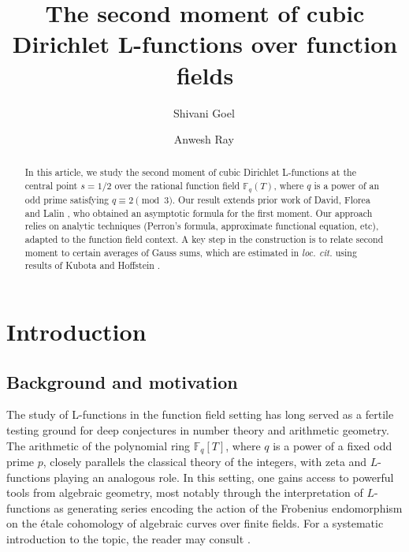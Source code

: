 \documentclass[table]{amsart}
\numberwithin{equation}{section}
\begin{document}
\title[Second moments for cubic L-functions]{The second moment of cubic Dirichlet L-functions over function fields}


\author[S.~Goel]{Shivani Goel\, }
\address[Goel]{Chennai Mathematical Institute, H1, SIPCOT IT Park, Kelambakkam, Siruseri, Tamil Nadu 603103, India}

\author[A.~Ray]{Anwesh Ray\, }
\address[Ray]{Chennai Mathematical Institute, H1, SIPCOT IT Park, Kelambakkam, Siruseri, Tamil Nadu 603103, India}










\begin{abstract}
In this article, we study the second moment of cubic Dirichlet L-functions at the central point $s=1/2$ over the rational function field $\mathbb{F}_q(T)$, where $q$ is a power of an odd prime satisfying $q \equiv 2 \pmod{3}$. Our result extends prior work of David, Florea and Lalin \cite{DFLCubic}, who obtained an asymptotic formula for the first moment. Our approach relies on analytic techniques (Perron's formula, approximate functional equation, etc), adapted to the function field context.  A key step in the construction is to relate second moment to certain averages of Gauss sums, which are estimated in \emph{loc. cit.} using results of Kubota \cite{kubota} and Hoffstein \cite{Hoffsteinmetaplectic}. 
\end{abstract}

\maketitle

\section{Introduction}
\subsection{Background and motivation}
\par The study of L-functions in the function field setting has long served as a fertile testing ground for deep conjectures in number theory and arithmetic geometry. The arithmetic of the polynomial ring \( \mathbb{F}_q[T] \), where \( q \) is a power of a fixed odd prime \( p \), closely parallels the classical theory of the integers, with zeta and \( L \)-functions playing an analogous role. In this setting, one gains access to powerful tools from algebraic geometry, most notably through the interpretation of \( L \)-functions as generating series encoding the action of the Frobenius endomorphism on the \'etale cohomology of algebraic curves over finite fields. For a systematic introduction to the topic, the reader may consult \cite{Rosenfunctionfields, weilconj, ThakurFFA}.
\end{document}
